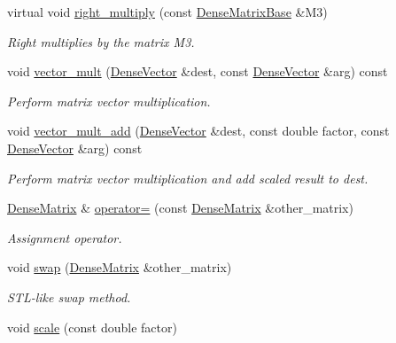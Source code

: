 \begin{DoxyCompactItemize}
virtual void \mbox{\hyperlink{classfemus_1_1_dense_matrix_a6de589e870d32a851fda1049b736bf99}{right\+\_\+multiply}} (const \mbox{\hyperlink{classfemus_1_1_dense_matrix_base}{Dense\+Matrix\+Base}} \&M3)
\begin{DoxyCompactList}\small\item\em Right multiplies by the matrix {\ttfamily M3}. \end{DoxyCompactList}\item 
void \mbox{\hyperlink{classfemus_1_1_dense_matrix_abbedc871f6bb0adebf1889a6ca8dbc85}{vector\+\_\+mult}} (\mbox{\hyperlink{classfemus_1_1_dense_vector}{Dense\+Vector}} \&dest, const \mbox{\hyperlink{classfemus_1_1_dense_vector}{Dense\+Vector}} \&arg) const
\begin{DoxyCompactList}\small\item\em Perform matrix vector multiplication. \end{DoxyCompactList}\item 
void \mbox{\hyperlink{classfemus_1_1_dense_matrix_a295b7577e8910a0600dacadd1c30b15b}{vector\+\_\+mult\+\_\+add}} (\mbox{\hyperlink{classfemus_1_1_dense_vector}{Dense\+Vector}} \&dest, const double factor, const \mbox{\hyperlink{classfemus_1_1_dense_vector}{Dense\+Vector}} \&arg) const
\begin{DoxyCompactList}\small\item\em Perform matrix vector multiplication and add scaled result to {\ttfamily dest}. \end{DoxyCompactList}\item 
\mbox{\hyperlink{classfemus_1_1_dense_matrix}{Dense\+Matrix}} \& \mbox{\hyperlink{classfemus_1_1_dense_matrix_a44a381eba83cf091b48a270854860c10}{operator=}} (const \mbox{\hyperlink{classfemus_1_1_dense_matrix}{Dense\+Matrix}} \&other\+\_\+matrix)
\begin{DoxyCompactList}\small\item\em Assignment operator. \end{DoxyCompactList}\item 
void \mbox{\hyperlink{classfemus_1_1_dense_matrix_acbd35539fd0ca78df190f3ec10800f88}{swap}} (\mbox{\hyperlink{classfemus_1_1_dense_matrix}{Dense\+Matrix}} \&other\+\_\+matrix)
\begin{DoxyCompactList}\small\item\em S\+T\+L-\/like swap method. \end{DoxyCompactList}\item 
void \mbox{\hyperlink{classfemus_1_1_dense_matrix_a1df3092a24679a976ec0c0cccae965df}{scale}} (const double factor)

\end{DoxyCompactItemize}
